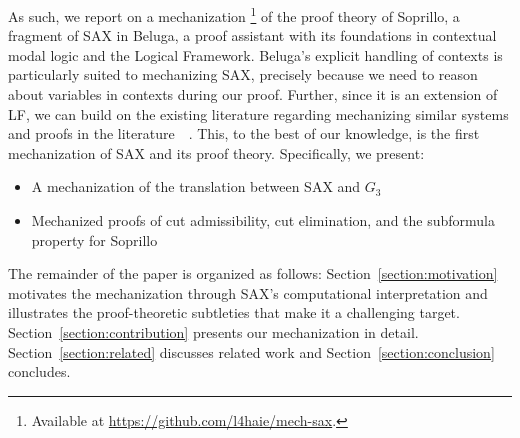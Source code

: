 As such, we report on a mechanization \footnote{Available at
  \url{https://github.com/l4haie/mech-sax}.} of the proof theory of Soprillo, a
fragment of SAX in Beluga, a proof assistant with its foundations in contextual
modal logic and the Logical Framework. Beluga's explicit handling of contexts is
particularly suited to mechanizing SAX, precisely because we need to reason
about variables in contexts during our proof. Further, since it is an extension
of LF, we can build on the existing literature regarding mechanizing similar
systems and proofs in the
literature~\cite{crary2009substructural}~\cite{Pfenning2000StructuralCutElimination}.
This, to the best of our knowledge, is the first mechanization of SAX and its
proof theory. Specifically, we present:
\begin{itemize}
  \item A mechanization of the translation between SAX and $G_3$
  \item Mechanized proofs of cut admissibility, cut elimination, and the
    subformula property for Soprillo
\end{itemize}

The remainder of the paper is organized as follows: Section~\ref{section:motivation}
motivates the mechanization through SAX's computational interpretation and
illustrates the proof-theoretic subtleties that make it a challenging target.
Section~\ref{section:contribution} presents our mechanization in detail.
Section~\ref{section:related} discusses related work and
Section~\ref{section:conclusion} concludes.